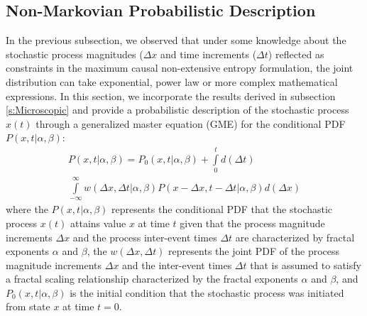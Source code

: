 \subsection{Non-Markovian Probabilistic Description}
\label{s:NonMarkovian}
In the previous subsection, we observed that under some knowledge about the stochastic process magnitudes ($\Delta x$ and time increments ($\Delta t$) reflected as constraints in the maximum causal non-extensive entropy formulation, the joint distribution can take exponential, power law or more complex mathematical expressions. In this section, we incorporate the results derived in subsection \ref{s:Microscopic} and provide a probabilistic description of the stochastic process $x(t)$ through a generalized master equation (GME) for the conditional PDF $P(x,t | \alpha, \beta)$:
\begin{eqnarray}
\label{generalizedME}
&  P(x,t | \alpha, \beta) = P_{0}(x,t | \alpha, \beta) + \int\limits_{0}^{t}  d(\Delta t) &\\
& \int\limits_{-\infty}^{\infty} w(\Delta x, \Delta t | \alpha, \beta) P(x - \Delta x, t - \Delta t | \alpha, \beta) d(\Delta x)& \nonumber
\end{eqnarray} 
where the  $P(x,t | \alpha, \beta)$ represents the conditional PDF that the stochastic process $x(t)$ attains value $x$ at time $t$ given that the process magnitude increments $\Delta x$ and the process inter-event times $\Delta t$ are characterized by fractal exponents $\alpha$ and $\beta$, the $w(\Delta x, \Delta t)$ represents the joint PDF of the process magnitude increments $\Delta x$ and the inter-event times $\Delta t$ that is assumed to satisfy a fractal scaling relationship characterized by the fractal exponents  $\alpha$ and $\beta$, and $ P_{0}(x,t | \alpha, \beta)$ is the initial condition that the stochastic process was initiated from state $x$ at time $t=0$. 

